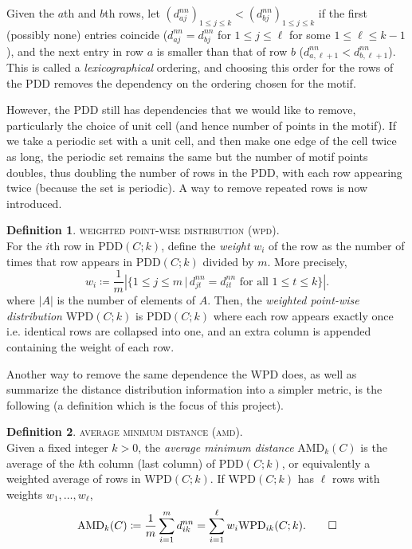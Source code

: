 \documentclass[11pt]{article}
\theoremstyle{definition}
\newtheorem{defi/}{Definition}[section]
\newenvironment{defi}
  {\renewcommand{\qedsymbol}{$\blacktriangleleft$}%
   \pushQED{\qed}\begin{defi/}}
  {\popQED\end{defi/}}
\begin{document}
Given the $a$th and $b$th rows, let $(d^{nn}_{aj})_{1\leq j\leq k} < (d^{nn}_{bj})_{1\leq j\leq k}$ if the first (possibly none) entries coincide ($d^{nn}_{aj} = d^{nn}_{bj}$ for $1\leq j\leq \ell$ for some $1\leq \ell\leq k-1$), and the next entry in row $a$ is smaller than that of row $b$ ($d^{nn}_{a,\ell+1}<d^{nn}_{b,\ell+1}$). This is called a \emph{lexicographical} ordering, and choosing this order for the rows of the PDD removes the dependency on the ordering chosen for the motif.

However, the PDD still has dependencies that we would like to remove, particularly the choice of unit cell (and hence number of points in the motif). If we take a periodic set with a unit cell, and then make one edge of the cell twice as long, the periodic set remains the same but the number of motif points doubles, thus doubling the number of rows in the PDD, with each row appearing twice (because the set is periodic). A way to remove repeated rows is now introduced.

\begin{defi}\textsc{weighted point-wise distribution (wpd).}\\
For the $i$th row in PDD$(C;k)$, define the \emph{weight} $w_i$ of the row as the number of times that row appears in PDD$(C;k)$ divided by $m$. More precisely,
\[
w_i \coloneqq \frac{1}{m}\left|\{1\leq j\leq m \,|\, d^{nn}_{jt} = d^{nn}_{it} \text{ for all } 1\leq t\leq k\}\right|.
\]
where $|A|$ is the number of elements of $A$. Then, the \emph{weighted point-wise distribution} WPD$(C;k)$ is PDD$(C;k)$ where each row appears exactly once i.e. identical rows are collapsed into one, and an extra column is appended containing the weight of each row.
\end{defi}

Another way to remove the same dependence the WPD does, as well as summarize the distance distribution information into a simpler metric, is the following (a definition which is the focus of this project).

\begin{defi}\textsc{average minimum distance (amd).}\label{amd}\\
Given a fixed integer $k > 0$, the \emph{average minimum distance} AMD$_k(C)$ is the average of the $k$th column (last column) of PDD$(C;k)$, or equivalently a weighted average of rows in WPD$(C;k)$. If WPD$(C;k)$ has $\ell$ rows with weights $w_1,\dots,w_\ell$,
\[
\text{AMD}_k(C) \coloneqq \frac{1}{m}\sum_{i=1}^m d^{nn}_{ik} = \sum_{i=1}^{\ell}w_i\text{WPD}_{ik}(C;k). \qedhere
\]
\end{defi}
\end{document}

